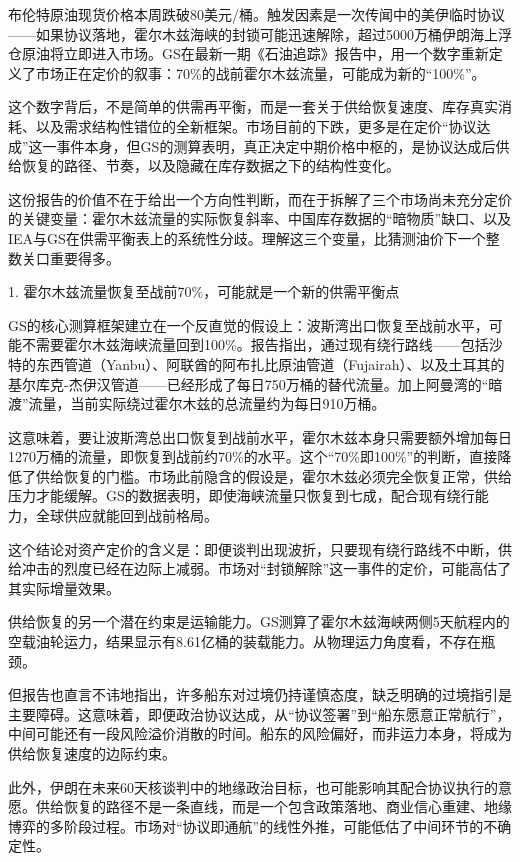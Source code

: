 \documentclass[11pt]{ctexart}
\begin{document}
布伦特原油现货价格本周跌破80美元/桶。触发因素是一次传闻中的美伊临时协议——如果协议落地，霍尔木兹海峡的封锁可能迅速解除，超过5000万桶伊朗海上浮仓原油将立即进入市场。GS在最新一期《石油追踪》报告中，用一个数字重新定义了市场正在定价的叙事：70\%的战前霍尔木兹流量，可能成为新的“100\%”。

这个数字背后，不是简单的供需再平衡，而是一套关于供给恢复速度、库存真实消耗、以及需求结构性错位的全新框架。市场目前的下跌，更多是在定价“协议达成”这一事件本身，但GS的测算表明，真正决定中期价格中枢的，是协议达成后供给恢复的路径、节奏，以及隐藏在库存数据之下的结构性变化。

这份报告的价值不在于给出一个方向性判断，而在于拆解了三个市场尚未充分定价的关键变量：霍尔木兹流量的实际恢复斜率、中国库存数据的“暗物质”缺口、以及IEA与GS在供需平衡表上的系统性分歧。理解这三个变量，比猜测油价下一个整数关口重要得多。

1. 霍尔木兹流量恢复至战前70\%，可能就是一个新的供需平衡点

GS的核心测算框架建立在一个反直觉的假设上：波斯湾出口恢复至战前水平，可能不需要霍尔木兹海峡流量回到100\%。报告指出，通过现有绕行路线——包括沙特的东西管道（Yanbu）、阿联酋的阿布扎比原油管道（Fujairah）、以及土耳其的基尔库克-杰伊汉管道——已经形成了每日750万桶的替代流量。加上阿曼湾的“暗渡”流量，当前实际绕过霍尔木兹的总流量约为每日910万桶。

这意味着，要让波斯湾总出口恢复到战前水平，霍尔木兹本身只需要额外增加每日1270万桶的流量，即恢复到战前约70\%的水平。这个“70\%即100\%”的判断，直接降低了供给恢复的门槛。市场此前隐含的假设是，霍尔木兹必须完全恢复正常，供给压力才能缓解。GS的数据表明，即使海峡流量只恢复到七成，配合现有绕行能力，全球供应就能回到战前格局。

这个结论对资产定价的含义是：即便谈判出现波折，只要现有绕行路线不中断，供给冲击的烈度已经在边际上减弱。市场对“封锁解除”这一事件的定价，可能高估了其实际增量效果。

供给恢复的另一个潜在约束是运输能力。GS测算了霍尔木兹海峡两侧5天航程内的空载油轮运力，结果显示有8.61亿桶的装载能力。从物理运力角度看，不存在瓶颈。

但报告也直言不讳地指出，许多船东对过境仍持谨慎态度，缺乏明确的过境指引是主要障碍。这意味着，即便政治协议达成，从“协议签署”到“船东愿意正常航行”，中间可能还有一段风险溢价消散的时间。船东的风险偏好，而非运力本身，将成为供给恢复速度的边际约束。

此外，伊朗在未来60天核谈判中的地缘政治目标，也可能影响其配合协议执行的意愿。供给恢复的路径不是一条直线，而是一个包含政策落地、商业信心重建、地缘博弈的多阶段过程。市场对“协议即通航”的线性外推，可能低估了中间环节的不确定性。
\end{document}
